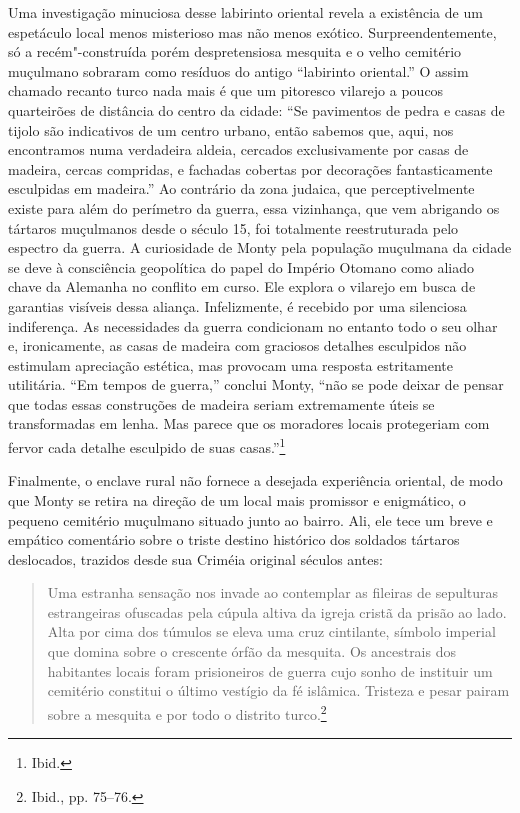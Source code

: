 Uma investigação minuciosa desse labirinto oriental revela a existência
de um espetáculo local menos misterioso mas não menos exótico.
Surpreendentemente, só a recém"-construída porém despretensiosa mesquita
e o velho cemitério muçulmano sobraram como resíduos do antigo
``labirinto oriental.'' O assim chamado recanto turco nada mais é que um
pitoresco vilarejo a poucos quarteirões de distância do centro da
cidade: ``Se pavimentos de pedra e casas de tijolo são indicativos de um
centro urbano, então sabemos que, aqui, nos encontramos numa verdadeira
aldeia, cercados exclusivamente por casas de madeira, cercas compridas,
e fachadas cobertas por decorações fantasticamente esculpidas em
madeira.'' Ao contrário da zona judaica, que perceptivelmente existe
para além do perímetro da guerra, essa vizinhança, que vem abrigando os
tártaros muçulmanos desde o século 15, foi totalmente reestruturada pelo
espectro da guerra. A curiosidade de Monty pela população muçulmana da
cidade se deve à consciência geopolítica do papel do Império Otomano
como aliado chave da Alemanha no conflito em curso. Ele explora o
vilarejo em busca de garantias visíveis dessa aliança. Infelizmente, é
recebido por uma silenciosa indiferença. As necessidades da guerra
condicionam no entanto todo o seu olhar e, ironicamente, as casas de
madeira com graciosos detalhes esculpidos não estimulam apreciação
estética, mas provocam uma resposta estritamente utilitária. ``Em tempos
de guerra,'' conclui Monty, ``não se pode deixar de pensar que todas
essas construções de madeira seriam extremamente úteis se transformadas
em lenha. Mas parece que os moradores locais protegeriam com fervor cada
detalhe esculpido de suas casas.''\footnote{Ibid.}

Finalmente, o enclave rural não fornece a desejada experiência oriental,
de modo que Monty se retira na direção de um local mais promissor e
enigmático, o pequeno cemitério muçulmano situado junto ao bairro. Ali,
ele tece um breve e empático comentário sobre o triste destino histórico
dos soldados tártaros deslocados, trazidos desde sua Criméia original
séculos antes:

\begin{quote}
Uma estranha sensação nos invade ao contemplar as fileiras de sepulturas
estrangeiras ofuscadas pela cúpula altiva da igreja cristã da prisão ao
lado. Alta por cima dos túmulos se eleva uma cruz cintilante, símbolo
imperial que domina sobre o crescente órfão da mesquita. Os ancestrais
dos habitantes locais foram prisioneiros de guerra cujo sonho de
instituir um cemitério constitui o último vestígio da fé islâmica.
Tristeza e pesar pairam sobre a mesquita e por todo o distrito
turco.\footnote{Ibid., pp. 75--76.}
\end{quote}

